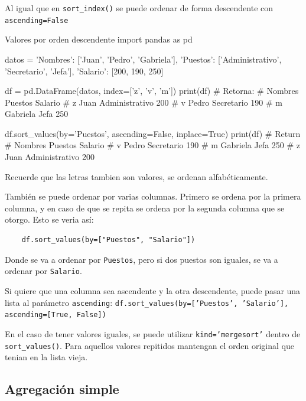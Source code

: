 Al igual que en \texttt{sort\_index()} se puede ordenar de forma descendente con \texttt{ascending=False}
\begin{pycode}{Valores por orden descendente}
import pandas as pd

datos = {
    'Nombres': ['Juan', 'Pedro', 'Gabriela'],
    'Puestos': ['Administrativo', 'Secretario', 'Jefa'],
    'Salario': [200, 190, 250]
}

df = pd.DataFrame(datos, index=['z', 'v', 'm']) 
print(df) # Retorna:
#     Nombres         Puestos  Salario
# z      Juan  Administrativo      200
# v     Pedro      Secretario      190
# m  Gabriela            Jefa      250

df.sort_values(by='Puestos', ascending=False, inplace=True)
print(df) # Return 
#     Nombres         Puestos  Salario
# v     Pedro      Secretario      190
# m  Gabriela            Jefa      250
# z      Juan  Administrativo      200
\end{pycode}

\begin{nota}
    Recuerde que las letras tambien son valores, se ordenan alfabéticamente.
\end{nota}

También se puede ordenar por varias columnas. Primero se ordena por la primera columna, y en caso de que se repita se ordena por la segunda columna que se otorgo. Esto se veria así:
\begin{verbatim}
    df.sort_values(by=["Puestos", "Salario"])
\end{verbatim}
Donde se va a ordenar por \texttt{Puestos}, pero si dos puestos son iguales, se va a ordenar por \texttt{Salario}.

\begin{nota}
    Si quiere que una columna sea ascendente y la otra descendente, puede pasar una lista al parámetro \texttt{ascending}: \texttt{df.sort\_values(by=['Puestos', 'Salario'], ascending=[True, False])}
\end{nota}

\begin{nota}
    En el caso de tener valores iguales, se puede utilizar \texttt{kind='mergesort'} dentro de \texttt{sort\_values()}. Para aquellos valores repitidos mantengan el orden original que tenian en la lista vieja.
\end{nota}



\subsection{Agregación simple}

